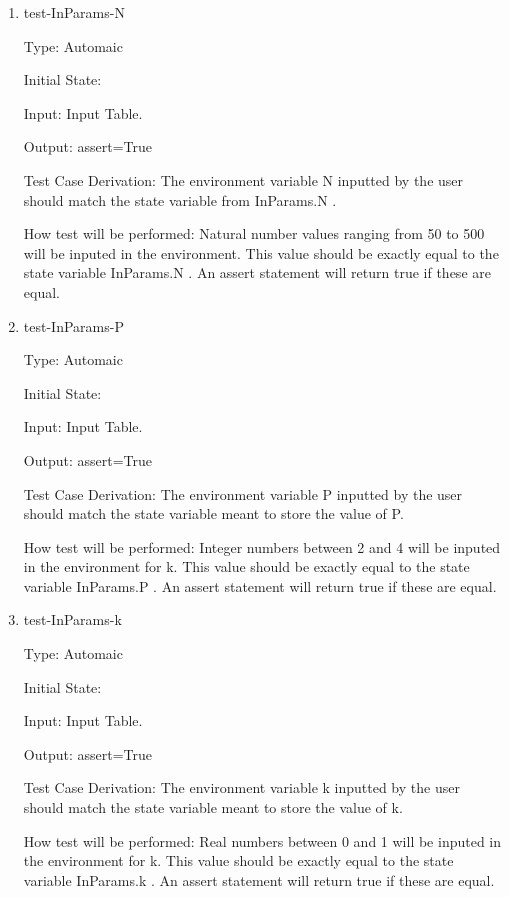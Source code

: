 \documentclass[12pt, titlepage]{article}
\begin{document}
\begin{enumerate}

\item{test-InParams-N\\} \label{INPARAMS}

Type: Automaic
					
Initial State: 
					
Input: Input Table.
					
Output: assert=True

Test Case Derivation: The environment variable N inputted by the user should 
match the state variable from InParams.N .

How test will be performed: Natural number values ranging from 50 to 500 will 
be 
inputed in the environment. This value should be exactly equal to the state 
variable InParams.N . An assert statement will return true if these are equal. 
				
\item{test-InParams-P\\}

Type: Automaic

Initial State: 

Input: Input Table.

Output: assert=True

Test Case Derivation: The environment variable P inputted by the user should 
match the state variable meant to store the value of P.

How test will be performed: Integer numbers between 2 and 4 
will be inputed in the environment for k. This value should be exactly equal to 
the state variable InParams.P . An assert statement will return true if these 
are equal.

\item{test-InParams-k\\}

Type: Automaic

Initial State: 

Input: Input Table.

Output: assert=True

Test Case Derivation: The environment variable k inputted by the user should 
match the state variable meant to store the value of k.

How test will be performed: Real numbers between 0 and 1 
will be inputed in the environment for k. This value should be exactly equal to 
the state variable InParams.k . An assert statement will return true if these 
are equal.
    
\end{enumerate}
\end{document}
